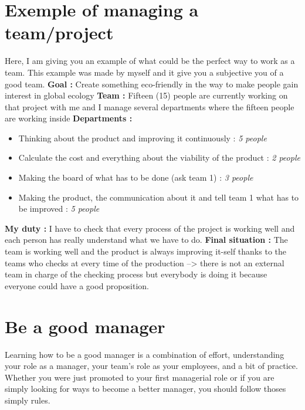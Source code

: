 \documentclass[a4paper,12pt]{report} %
\begin{document}
\section{Exemple of managing a team/project}
Here, I am giving you an example of what could be the perfect way to work as a team. This example was made by myself and it give you a subjective you of a good team. \newline \newline
\textbf{Goal :} Create something eco-friendly in the way to make people gain interest in global ecology \newline
\textbf{Team :} Fifteen (15) people are currently working on that project with me and I manage several departments where the fifteen people are working inside \newline
\textbf{Departments :}
\begin{itemize}
\item Thinking about the product and improving it continuously : \textit{5 people}
\item Calculate the cost and everything about the viability of the product : \textit{2 people}
\item Making the board of what has to be done (ask team 1) : \textit{3 people}
\item Making the product, the communication about it and tell team 1 what has to be improved : \textit{5 people}
\end{itemize}
\textbf{My duty :} I have to check that every process of the project is working well and each person has really understand what we have to do. \newline
\textbf{Final situation :} The team is working well and the product is always improving it-self thanks to the teams who checks at every time of the production --> there is not an external team in charge of the checking process but everybody is doing it because everyone could have a good proposition. \newline
\section{Be a good manager}
Learning how to be a good manager is a combination of effort, understanding your role as a manager, your team’s role as your employees, and a bit of practice. Whether you were just promoted to your first managerial role or if you are simply looking for ways to become a better manager, you should follow thoses simply rules.
\end{document}
